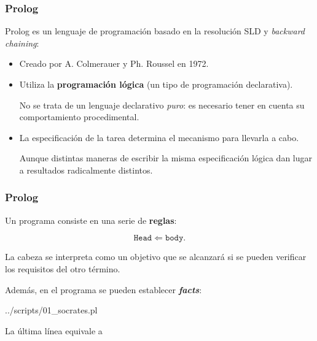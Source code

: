 \documentclass{beamer}    %
\newcommand\cod{../scripts}
\begin{document}
\begin{frame}
 \frametitle{Prolog}

 Prolog es un lenguaje de programación basado en la
 resolución SLD y \emph{backward chaining}:
 \vspace{5mm}

 \begin{itemize}
 \item
 Creado por %
 {\sc A. Colmerauer} y {\sc Ph. Roussel} en 1972.
 \item
 Utiliza la {\bf programación lógica} (un tipo de
 programación declarativa).\vspace{2mm}

 \hfill\parbox{.9\linewidth}
 {\small No se trata de un lenguaje declarativo \emph{puro}:
   es necesario tener en cuenta su comportamiento
   procedimental.}\vspace{3mm}

 \item
 La especificación de la tarea determina el mecanismo para
 llevarla a cabo.\vspace{2mm}

  \hfill\parbox{.9\linewidth}
 {\small Aunque distintas maneras de escribir la misma
   especificación lógica dan lugar a resultados radicalmente
   distintos.}
 \end{itemize}
\end{frame}

\begin{frame}
 \frametitle{Prolog}
 Un programa consiste en una serie de {\bf reglas}:

 \[\texttt{Head} \Leftarrow \texttt{body}.\]

 La cabeza se interpreta como un objetivo que se alcanzará
 si se pueden verificar los requisitos del otro término.

 Además, en el programa se pueden establecer
 {\bf\emph{facts}}:

 \begin{center}
 \begin{minipage}[t]{.42\linewidth}
 \VerbatimInput
 {\cod/01_socrates.pl}
 \end{minipage}
 \end{center}

 La última línea equivale a

\end{frame}
\end{document}

